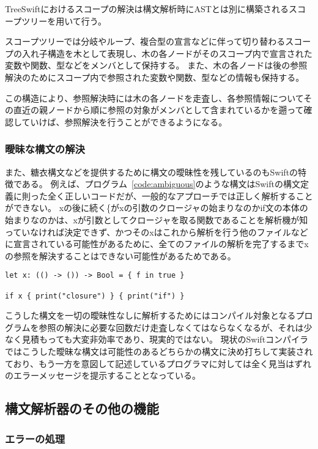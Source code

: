 TreeSwiftにおけるスコープの解決は構文解析時にASTとは別に構築されるスコープツリーを用いて行う。

スコープツリーでは分岐やループ、複合型の宣言などに伴って切り替わるスコープの入れ子構造を木として表現し、木の各ノードがそのスコープ内で宣言された変数や関数、型などをメンバとして保持する。
また、木の各ノードは後の参照解決のためにスコープ内で参照された変数や関数、型などの情報も保持する。

この構造により、参照解決時には木の各ノードを走査し、各参照情報についてその直近の親ノードから順に参照の対象がメンバとして含まれているかを遡って確認していけば、参照解決を行うことができるようになる。

\subsubsection{曖昧な構文の解決}

また、糖衣構文などを提供するために構文の曖昧性を残しているのもSwiftの特徴である。
例えば、プログラム~\ref{code:ambiguous}のような構文はSwiftの構文定義に則った全く正しいコードだが、一般的なアプローチでは正しく解析することができない。
xの後に続く\{がxの引数のクロージャの始まりなのかif文の本体の始まりなのかは、xが引数としてクロージャを取る関数であることを解析機が知っていなければ決定できず、かつそのxはこれから解析を行う他のファイルなどに宣言されている可能性があるために、全てのファイルの解析を完了するまでxの参照を解決することはできない可能性があるためである。

\begin{lstlisting}[caption=曖昧な構文を持った正しいSwiftコード, label=code:ambiguous]
let x: (() -> ()) -> Bool = { f in true }

if x { print("closure") } { print("if") }
\end{lstlisting}

こうした構文を一切の曖昧性なしに解析するためにはコンパイル対象となるプログラムを参照の解決に必要な回数だけ走査しなくてはならなくなるが、それは少なく見積もっても大変非効率であり、現実的ではない。
現状のSwiftコンパイラではこうした曖昧な構文は可能性のあるどちらかの構文に決め打ちして実装されており、もう一方を意図して記述しているプログラマに対しては全く見当はずれのエラーメッセージを提示することとなっている。


\subsection{構文解析器のその他の機能}

\subsubsection{エラーの処理}

